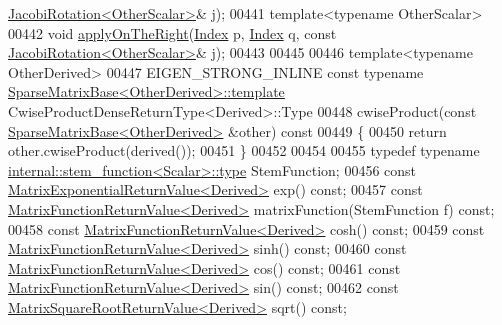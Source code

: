 \begin{DoxyCode}
      \hyperlink{group___jacobi___module_class_eigen_1_1_jacobi_rotation}{JacobiRotation<OtherScalar>}& j);
00441     \textcolor{keyword}{template}<\textcolor{keyword}{typename} OtherScalar>
00442     \textcolor{keywordtype}{void} \hyperlink{group___core___module_a45d91752925d2757fc8058a293b15462}{applyOnTheRight}(\hyperlink{namespace_eigen_a62e77e0933482dafde8fe197d9a2cfde}{Index} p, \hyperlink{namespace_eigen_a62e77e0933482dafde8fe197d9a2cfde}{Index} q, \textcolor{keyword}{const} 
      \hyperlink{group___jacobi___module_class_eigen_1_1_jacobi_rotation}{JacobiRotation<OtherScalar>}& j);
00443 
00445 
00446     \textcolor{keyword}{template}<\textcolor{keyword}{typename} OtherDerived>
00447     EIGEN\_STRONG\_INLINE \textcolor{keyword}{const} \textcolor{keyword}{typename} \hyperlink{group___sparse_core___module_class_eigen_1_1_sparse_matrix_base}{SparseMatrixBase<OtherDerived>::template}
       CwiseProductDenseReturnType<Derived>::Type
00448     cwiseProduct(\textcolor{keyword}{const} \hyperlink{group___sparse_core___module_class_eigen_1_1_sparse_matrix_base}{SparseMatrixBase<OtherDerived>} &other)\textcolor{keyword}{ const}
00449 \textcolor{keyword}{    }\{
00450       \textcolor{keywordflow}{return} other.cwiseProduct(derived());
00451     \}
00452 
00454 
00455     \textcolor{keyword}{typedef} \textcolor{keyword}{typename} \hyperlink{struct_eigen_1_1internal_1_1stem__function}{internal::stem\_function<Scalar>::type} 
      StemFunction;
00456     \textcolor{keyword}{const} \hyperlink{struct_eigen_1_1_matrix_exponential_return_value}{MatrixExponentialReturnValue<Derived>} exp() \textcolor{keyword}{const};
00457     \textcolor{keyword}{const} \hyperlink{class_eigen_1_1_matrix_function_return_value}{MatrixFunctionReturnValue<Derived>} matrixFunction(StemFunction 
      f) \textcolor{keyword}{const};
00458     \textcolor{keyword}{const} \hyperlink{class_eigen_1_1_matrix_function_return_value}{MatrixFunctionReturnValue<Derived>} cosh() \textcolor{keyword}{const};
00459     \textcolor{keyword}{const} \hyperlink{class_eigen_1_1_matrix_function_return_value}{MatrixFunctionReturnValue<Derived>} sinh() \textcolor{keyword}{const};
00460     \textcolor{keyword}{const} \hyperlink{class_eigen_1_1_matrix_function_return_value}{MatrixFunctionReturnValue<Derived>} cos() \textcolor{keyword}{const};
00461     \textcolor{keyword}{const} \hyperlink{class_eigen_1_1_matrix_function_return_value}{MatrixFunctionReturnValue<Derived>} sin() \textcolor{keyword}{const};
00462     \textcolor{keyword}{const} \hyperlink{class_eigen_1_1_matrix_square_root_return_value}{MatrixSquareRootReturnValue<Derived>} sqrt() \textcolor{keyword}{const};

\end{DoxyCode}
